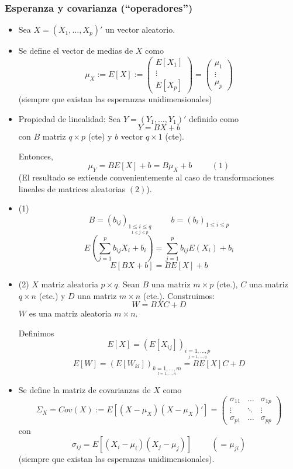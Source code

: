 \documentclass[11pt,a4paper]{article}
\begin{document}
\subsubsection{Esperanza y covarianza (``operadores'')}
\begin{itemize}
\item Sea $X = (X_{1}, \dots, X_{p})'$ un vector aleatorio.

\item Se define el vector de medias de $X$ como
$$\mu_{X} := E[X] := \begin{pmatrix}
E[X_{1}] \\
\vdots \\
E[X_{p}]
\end{pmatrix} = \begin{pmatrix}
\mu_{1} \\
\vdots \\
\mu_{p}
\end{pmatrix}$$
(siempre que existan las esperanzas unidimensionales)

\item Propiedad de linealidad: Sea $Y = (Y_{1}, \dots, Y_{1})'$ definido como
$$Y = BX + b$$
con $B$ matriz $q \times p$ (cte) y $b$ vector $q \times 1$ (cte).

Entonces,
$$\mu_{Y} = BE[X] + b = B \mu_{X} + b \hspace{1cm} (1)$$
(El resultado se extiende convenientemente al caso de transformaciones lineales de matrices aleatorias $(2)$).

\item (1) $$B = (b_{ij})_{\underset{1 \leq j \leq p}{1 \leq i \leq q}} \hspace{1cm} b = (b_{i})_{1 \leq i \leq p}$$
$$E(\sum_{j=1}^{p} b_{ij}X_{i} + b_{i}) = \sum_{j=1}^{p} b_{ij} E(X_{i}) + b_{i}$$
$$E[BX + b] = BE[X] + b$$

\item (2) $X$ matriz aleatoria $p \times q$. Sean $B$ una matriz $m \times p$ (cte.), $C$ una matriz $q \times n$ (cte.) y $D$ una matriz $m \times n$ (cte.). Construimos:
$$W = BXC + D$$
$W$ es una matriz aleatoria $m \times n$.

Definimos
$$E[X] = (E[X_{ij}])_{\underset{j = 1, \dots, q}{i = 1, \dots, p}}$$
$$E[W] = (E[W_{kl}])_{\underset{l = 1, \dots, n}{k = 1, \dots, m}} = BE[X]C + D$$

\item Se define la matriz de covarianzas de $X$ como
$$\Sigma_{X} = Cov(X) := E[(X - \mu_{X})(X - \mu_{X})'] = \begin{pmatrix}
\sigma_{11} & \dots & \sigma_{1p} \\
\vdots & \ddots & \vdots \\
\sigma_{p1} & \dots & \sigma_{pp}
\end{pmatrix}$$
con
$$\sigma_{ij} = E[(X_{i}-\mu_{i})(X_{j}-\mu_{j})] \hspace{1cm} (= \mu_{ji})$$
(siempre que existan las esperanzas unidimensionales).


\end{itemize}
\end{document}
